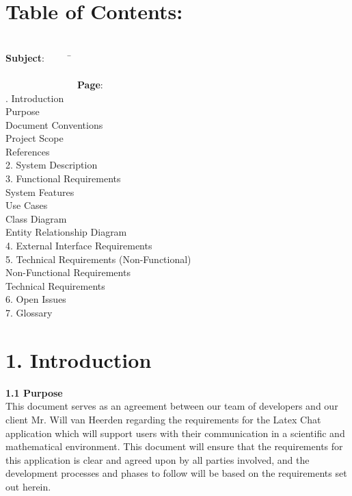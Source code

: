 \documentclass[29pt,a4paper]{moderncv}
\begin{document}
\section{\textbf{Table of Contents:}}
\begin{tabbing}
\\\textbf{Subject}: ~~~~~\= ~~~~~~~~~~~~~~~~~~~~~~~~~~~~~~~~~~~~~~~~~~~~~~~~~~~~~~~~~~~~~~~~~~~~~~~~~~~~~~~~~~~~~~~\= \textbf{Page}:
\\. Introduction \> \\							
 Purpose 	\\							
 Document Conventions 					\\
 Project Scope 							\\
 References 							\\
2. System Description \> 					\\
3. Functional Requirements \> \\				
 System Features \\
 Use Cases \\
 Class Diagram \\
 Entity Relationship Diagram \\
4. External Interface Requirements \> \\
5. Technical Requirements (Non-Functional) \> \\
 Non-Functional Requirements \\
 Technical Requirements \\
6. Open Issues \> 			\\				
7. Glossary \>  			\\				

\end{tabbing}
\newpage
	\section*{\textbf{1. Introduction}}
	\vspace{4mm}
	
		\textbf{1.1 Purpose}
			\\This document serves as an agreement between our team of developers and our client Mr. Will van Heerden regarding the requirements for the Latex Chat application which will support users with their communication in a scientific and mathematical environment.  This document will ensure that the requirements for this application is clear and agreed upon by all parties involved, and the development processes and phases to follow will be based on the requirements set out herein.\\
		\vspace{1mm}
		
\end{document}

